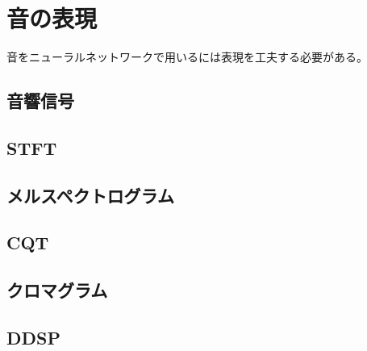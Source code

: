 \section{音の表現}
\label{sec:preprocess}

音をニューラルネットワークで用いるには表現を工夫する必要がある。

\subsection{音響信号}

\subsection{STFT}

\subsection{メルスペクトログラム}

\subsection{CQT}

\subsection{クロマグラム}

\subsection{DDSP}

